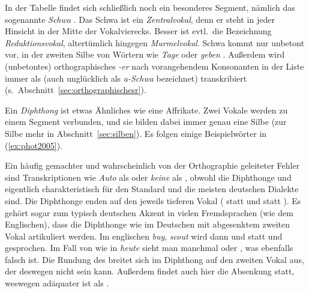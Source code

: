 In der Tabelle findet sich schließlich noch ein besonderes Segment, nämlich das sogenannte \textit{Schwa} \textipa{[@]}.
Das Schwa ist ein \textit{Zentralvokal}, denn er steht in jeder Hinsicht in der Mitte der Vokalvierecks.
Besser ist evtl.\ die Bezeichnung \textit{Reduktionsvokal}, altertümlich hingegen \textit{Murmelvokal}.
Schwa kommt nur unbetont vor, \zB in der zweiten Silbe von Wörtern wie \textit{Tage} \textipa{[ta:g@]} oder \textit{geben} \textipa{[ge:b@n]}.
Außerdem wird (unbetontes) orthographisches \textit{-er} nach vorangehendem Konsonanten in der Liste immer als \textipa{[5]} (auch unglücklich als \textit{a-Schwa} bezeichnet) transkribiert (s.\ Abschnitt~\ref{sec:orthographischesr}).


Ein \textit{Diphthong} ist etwas Ähnliches wie eine Affrikate.
Zwei Vokale werden zu einem Segment verbunden, und sie bilden dabei immer genau eine Silbe (zur Silbe mehr in Abschnitt~\ref{sec:silben}).
Es folgen einige Beispielwörter in (\ref{ex:phot2005}).

\begin{exe}
  \ex\label{ex:phot2005}
  \begin{xlist}
  \end{xlist}
\end{exe}

Ein häufig gemachter und wahrscheinlich von der Orthographie geleiteter Fehler sind Transkriptionen wie \textit{Auto} als \Ast\textipa{[P\t{aU}to]} oder \textit{keine} als \Ast\textipa{[k\t{aI}ne]}, obwohl die Diphthonge \textipa{[\t{aE}]} und \textipa{[\t{aO}]} eigentlich charakteristisch für den Standard und die meisten deutschen Dialekte sind.
Die Diphthonge enden auf den jeweils tieferen Vokal (\textipa{[O]} statt \textipa{[U]} und \textipa{[E]} statt \textipa{[I]}).
Es gehört sogar zum typisch deutschen Akzent in vielen Fremdsprachen (wie \zB dem Englischen), dass die Diphthonge wie im Deutschen mit abgesenktem zweiten Vokal artikuliert werden.
Im englischen \textit{buy}, \textit{scout} wird dann \textipa{[b\t{aE}]} und \textipa{[sk\t{aO}t]} statt \textipa{[b\t{aI}]} und \textipa{[sk\t{aU}t]} gesprochen.
Im Fall von \textipa{[\t{O\oe}]} wie in \textit{heute} \textipa{[h\t{O\oe}t@]} sieht man manchmal \textipa{[\t{OI}]} oder \textipa{[\t{OY}]}, was ebenfalls falsch ist.
Die Rundung des \textipa{[o]} breitet sich im Diphthong auf den zweiten Vokal aus, der deswegen nicht \textipa{[I]} sein kann.
Außerdem findet auch hier die Absenkung statt, weswegen \textipa{[\t{O\oe}]} adäquater ist als \textipa{[\t{OY}]}.

